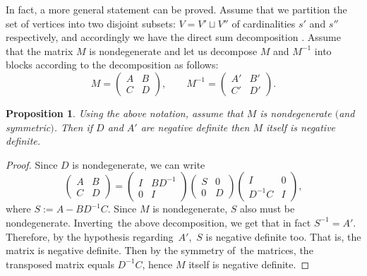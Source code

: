 \documentclass[10pt,a4paper]{amsart}
\newcounter{theorem}
\newtheorem{Proposition}[Theorem]{Proposition}
 { \theoremstyle{definition}
\newtheorem{Definition}[Theorem]{Definition}
\newtheorem{Note}[Theorem]{Note}
\newtheorem{Example}[Theorem]{Example}
\newtheorem{Remark}[Theorem]{Remark}
\newtheorem{Question}[theorem]{Question}
}
\begin{document}
In fact, a more general statement can be proved. Assume that we partition the set of vertices into two disjoint subsets: $V=V'\sqcup V''$ of cardinalities $s'$ and $s''$ respectively, and accordingly we have the direct sum decomposition .
Assume that the matrix $M$ is nondegenerate and let us decompose $M$ and $M^{-1}$ into blocks according to the decomposition  as follows:
\[
M=\begin{pmatrix} A& B\\ C& D\end{pmatrix}, \qquad
M^{-1}=\begin{pmatrix} A'& B'\\ C'& D'\end{pmatrix}.
\]
\begin{Proposition}\label{prop:app2}
 Using the above notation, assume that $M$ is nondegenerate $($and symmetric$)$. Then if
 $D$ and $A'$ are negative definite then $M$ itself is negative definite.
\end{Proposition}

\begin{proof}
 Since $D$ is nondegenerate, we can write
\[
\begin{pmatrix} A& B\\ C& D\end{pmatrix}=
\begin{pmatrix} I& BD^{-1}\\ 0& I\end{pmatrix}
\begin{pmatrix} S& 0\\ 0& D\end{pmatrix}
\begin{pmatrix} I& 0\\ D^{-1}C& I\end{pmatrix},
\]
where $S:= A-BD^{-1}C$. Since $M$ is nondegenerate, $S$ also must be nondegenerate.
Inverting~the above decomposition, we get that in fact $S^{-1}=A'$. Therefore, by the hypothesis regarding~$A'$,~$S$ is negative definite too. That is, the matrix
 is negative definite.
Then by the symmetry of~the matrices, the transposed matrix  equals
$D^{-1}C$, hence $M$ itself is negative definite.
\end{proof}
\end{document}
